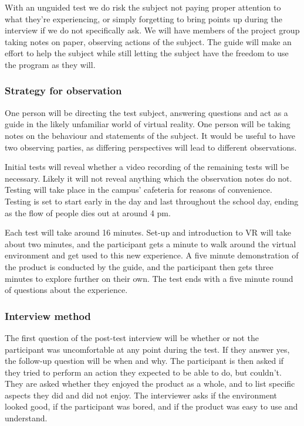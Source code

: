 With an unguided test we do risk the subject not paying proper attention to what they're experiencing, or simply forgetting to bring points up during the interview if we do not specifically ask. We will have members of the project group taking notes on paper, observing actions of the subject. The guide will make an effort to help the subject while still letting the subject have the freedom to use the program as they will.

\subsubsection{Strategy for observation}

One person will be directing the test subject, answering questions and act as a guide in the likely unfamiliar world of virtual reality. One person will be taking notes on the behaviour and statements of the subject. It would be useful to have two observing parties, as differing perspectives will lead to different observations. 

Initial tests will reveal whether a video recording of the remaining tests will be necessary. Likely it will not reveal anything which the observation notes do not. Testing will take place in the campus' cafeteria for reasons of convenience. Testing is set to start early in the day and last throughout the school day, ending as the flow of people dies out at around 4 pm.

Each test will take around 16 minutes. Set-up and introduction to VR will take about two minutes, and the participant gets a minute to walk around the virtual environment and get used to this new experience. A five minute demonstration of the product is conducted by the guide, and the participant then gets three minutes to explore further on their own. The test ends with a five minute round of questions about the experience. 



\subsubsection{Interview method}
The first question of the post-test interview will be whether or not the participant was uncomfortable at any point during the test. If they answer yes, the follow-up question will be when and why.
The participant is then asked if they tried to perform an action they expected to be able to do, but couldn't. They are asked whether they enjoyed the product as a whole, and to list specific aspects they did and did not enjoy. The interviewer asks if the environment looked good, if the participant was bored, and if the product was easy to use and understand. 
\iffalse
